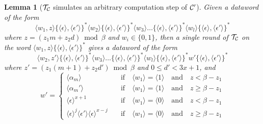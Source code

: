 \documentclass[11pt]{article} \usepackage{amsfonts,amsmath,amssymb,amsthm}
\newtheorem{lemma}{Lemma}
\newcommand{\tne}[1]{\ensuremath{\langle #1\rangle}}
\newcommand{\encodeOne}{\tne{1}}
\newcommand{\encodeZero}{\tne{0}}
\newcommand{\encodeDeletion}{\tne{\epsilon}}
\newcommand{\encodeDeletionPrime}{\tne{\epsilon'}}
\begin{document}
\begin{lemma}[$\mathcal{T_{\mathcal{C}}}$ simulates an arbitrary computation step of $\mathcal{C'}$]\label{lem:simulating a computation step of C}
Given a dataword of the form
\begin{equation}\label{eq:TS dataword before simulated computation step}
\tne{w_1,z}\{\encodeDeletion,\encodeDeletionPrime\}^\ast\tne{w_2}\{\encodeDeletion,\encodeDeletionPrime\}^\ast\tne{w_3}\ldots \{\encodeDeletion,\encodeDeletionPrime\}^\ast\tne{w_l}\{\encodeDeletion,\encodeDeletionPrime\}^\ast 
\end{equation}
where $z=(z_1m+z_2d)\bmod\beta$ and $w_i\in\{0,1\}$, then a single round of $\mathcal{T_{\mathcal{C}}}$ on the word $\tne{w_1,z}\{\encodeDeletion,\encodeDeletionPrime\}^\ast$ gives a dataword of the form
\begin{equation}\label{eq:TS dataword after simulated computation step}
\tne{w_2,z'}\{\encodeDeletion,\encodeDeletionPrime\}^\ast\tne{w_3}\ldots \{\encodeDeletion,\encodeDeletionPrime\}^\ast\tne{w_l}\{\encodeDeletion,\encodeDeletionPrime\}^\ast w' \{\encodeDeletion,\encodeDeletionPrime\}^\ast
\end{equation}
where $z'=(z_1(m+1)+z_2d')\bmod\beta$ and $0\leqslant d'<3x+1$, and
\begin{equation}\label{eq:values for w'}
w'=
\begin{cases} \tne{\alpha_m} &\quad\textrm{if}\quad  \tne{w_1}=\encodeOne\quad \textrm{and}\quad z<\beta-z_1\\
 \tne{\alpha_m'} &\quad\textrm{if}\quad  \tne{w_1}=\encodeOne\quad \textrm{and}\quad z\geqslant\beta-z_1\\
\encodeDeletion^{x+1} &\quad\textrm{if}\quad \tne{w_1}=\encodeZero\quad \textrm{and}\quad z<\beta-z_1\\
\encodeDeletion^{j}\encodeDeletionPrime\encodeDeletion^{x-j}  &\quad\textrm{if}\quad  \tne{w_1}=\encodeZero\quad \textrm{and}\quad z\geqslant\beta-z_1
\end{cases}
\end{equation}
\end{lemma}
\end{document}
